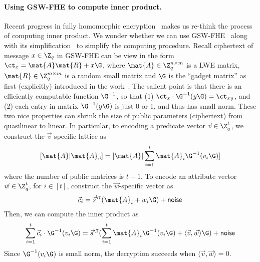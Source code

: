 \paragraph{Using GSW-FHE to compute inner product.} Recent progress in fully homomorphic encryption~\cite{C:GenSahWat13} makes us re-think the process of computing inner product. We wonder whether we can use GSW-FHE~\cite{C:GenSahWat13} along with its simplification~\cite{C:AlpPei14} to simplify the computing procedure. Recall ciphertext of message $x \in \Z_q$ in GSW-FHE can be view in the form $\ct_x = \mat{A} \mat{R} + x \G$, where $\mat{A} \in \Z_q^{n \times m}$ is a LWE matrix, $\mat{R} \in \Z_q^{m \times m}$ is a random small matrix and $\G$ is the ``gadget matrix'' as first (explicitly) introduced in the work~\cite{EC:MicPei12}. The salient point is that there is an efficiently computable function $\G^{-1}$, so that (1) $\ct_x \cdot \G^{-1}(y \G) = \ct_{xy}$, and (2) each entry in matrix $\G^{-1}(y \G)$ is just 0 or 1, and thus has small norm. These two nice properties can shrink the size of public parameters (ciphertext) from quasilinear to linear. In particular, to encoding a predicate vector $\vec{v} \in \Z_q^t$, we construct the $\vec{v}$-specific lattice as
$$[\mat{A} | \mat{A}_{\vec{v}}] = [\mat{A} | \sum_{i = 1}^t  \mat{A}_{i} \G^{-1}(v_i \G)]$$
where the number of public matrices is $t + 1$. To encode an attribute vector $\vec{w} \in \Z_q^{t}$, for $i \in [t]$, construct the $\vec{w}$-specific vector as
$$\vec{c}_i = \vec{s}^\T ( \mat{A}_i +  w_i \G) + \mathsf{noise}$$
Then, we can compute the inner product as
$$\sum_{i = 1}^t \vec{c}_i \cdot \G^{-1}(v_i \G) = \vec{s}^\T (\sum_{i = 1}^t  \mat{A}_{i} \G^{-1}(v_i \G) + \langle \vec{v}, \vec{w} \rangle \G) +  \mathsf{noise}$$
Since $\G^{-1}(v_i \G)$ is small norm, the decryption succeeds when $\langle \vec{v}, \vec{w} \rangle = 0$.

